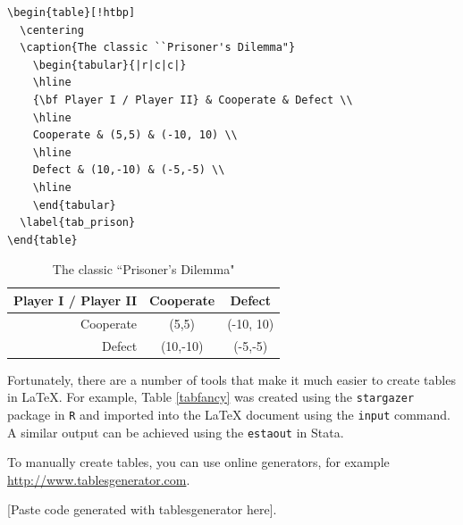 \documentclass[11pt,letterpaper,oneside]{article} %
\begin{document}
\begin{verbatim}
\begin{table}[!htbp]
  \centering
  \caption{The classic ``Prisoner's Dilemma"}
    \begin{tabular}{|r|c|c|}
    \hline
    {\bf Player I / Player II} & Cooperate & Defect \\
    \hline
    Cooperate & (5,5) & (-10, 10) \\
    \hline
    Defect & (10,-10) & (-5,-5) \\
    \hline
    \end{tabular}
  \label{tab_prison}
\end{table}
\end{verbatim}

\begin{table}[!htbp]
  \centering
  \caption{The classic ``Prisoner's Dilemma"}
    \begin{tabular}{|r|c|c|}
    \hline
    {\bf Player I / Player II} & Cooperate & Defect \\
    \hline
    Cooperate & (5,5) & (-10, 10) \\
    \hline
    Defect & (10,-10) & (-5,-5) \\
    \hline
    \end{tabular}
  \label{tab_prison}
\end{table}

Fortunately, there are a number of tools that make it much easier to create tables in {\LaTeX}. For example, Table \ref{tabfancy} was created using the \texttt{stargazer} package in \texttt{R} and imported into the {\LaTeX} document using the \texttt{input} command. A similar output can be achieved using the \texttt{estaout} in Stata.


To manually create tables, you can use online generators, for example \url{http://www.tablesgenerator.com}.

\begin{center}
[Paste code generated with tablesgenerator here].
\end{center}
\end{document}
